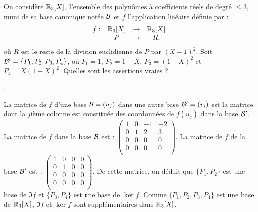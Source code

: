 \begin{question}
On considère $\mathbb{R}_3[X]$, l'ensemble des polynômes à coefficients réels de degré $\le 3$, muni de sa base canonique notée ${\cal {B}}$ et $f$ l'application linéaire définie par : 
$$\begin{array}{rccc}f:&\mathbb{R}_3[X] &\to& \mathbb{R}_3[X]\\
& P&\to &R, \end{array}$$
où $R$ est le reste de la division euclidienne de $P$ par $(X-1)^2$. Soit ${\cal {B'}} =\{P_1,P_2,P_3,P_4\}$, où $P_1=1$, $P_2=1-X$, $P_3=(1-X)^2$ et $P_4=X(1-X)^2$. Quelles sont les assertions vraies ?
\begin{answers}  
.
\end{answers}
\begin{explanations} La matrice de $f$  d'une base $ {\cal {B}}=(u_j)$ dans une autre base $ {\cal {B}}'=(v_i)$ est la matrice  dont la $j$ième colonne est constituée des coordonnées de  $f(u_j)$ dans la base $ {\cal {B}}'$.
\vskip0mm
La matrice de $f$ dans la base ${\cal {B}}$ est : $\left(\begin{array}{rccc}
1&0&-1&-2\\
0&1&2&3\\ 
0&0&0&0\\
0&0&0&0\\
\end{array}\right)$.
\vskip0mm
La matrice de $f$ de la base $ {\cal {B'}}$ est : $
\left(\begin{array}{rccc}
1&0&0&0\\
0&1&0&0\\ 
0&0&0&0\\
0&0&0&0\\
\end{array}\right).$
\vskip0mm
De cette matrice, on déduit que $\{P_1,P_2\}$ est une base de $\Im f$ et $\{P_3,P_4\}$ est une base de $\ker f$. Comme $\{P_1,P_2,P_3,P_4\}$ est une base de $\mathbb{R}_3[X]$, $\Im f$ et $\ker f$ sont  supplémentaires dans  $\mathbb{R}_3[X]$.
\end{explanations}
\end{question}

